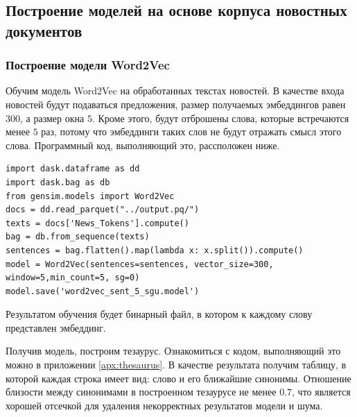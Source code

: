 \documentclass[coursework]{SCWorks}
\begin{document}
\subsection{Построение моделей на основе корпуса новостных документов}
\subsubsection{Построение модели Word2Vec}
\label{section:word2vec-construction}
Обучим модель Word2Vec на обработанных текстах новостей. В качестве входа новостей будут подаваться предложения, размер получаемых эмбеддингов равен $300$, а размер окна $5$. Кроме этого, будут отброшены слова, которые встречаются менее $5$ раз, потому что эмбеддинги таких слов не будут отражать смысл этого слова. Программный код, выполняющий это, рассположен ниже.
\begin{verbatim}
import dask.dataframe as dd
import dask.bag as db
from gensim.models import Word2Vec
docs = dd.read_parquet("../output.pq/")
texts = docs['News_Tokens'].compute()
bag = db.from_sequence(texts)
sentences = bag.flatten().map(lambda x: x.split()).compute()
model = Word2Vec(sentences=sentences, vector_size=300, window=5,min_count=5, sg=0)
model.save('word2vec_sent_5_sgu.model')
\end{verbatim}

Результатом обучения будет бинарный файл, в котором к каждому слову представлен эмбеддинг.

Получив модель, построим тезаурус. Ознакомиться с кодом, выполняющий это можно в приложении \ref{apx:thesaurus}. В качестве результата получим таблицу, в которой каждая строка имеет вид: слово и его ближайшие синонимы. Отношение близости между синонимами в построенном тезаурусе не менее $0.7$, что является хорошей отсечкой для удаления некорректных результатов модели и шума.
\end{document}
